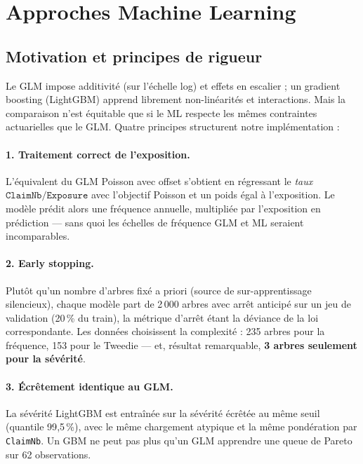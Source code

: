 \documentclass[11pt,a4paper]{article}
\begin{document}
\section{Approches Machine Learning}

\subsection{Motivation et principes de rigueur}

Le GLM impose additivité (sur l'échelle log) et effets en escalier ; un gradient boosting (LightGBM) apprend librement non-linéarités et interactions. Mais la comparaison n'est équitable que si le ML respecte les mêmes contraintes actuarielles que le GLM. Quatre principes structurent notre implémentation :

\paragraph{1. Traitement correct de l'exposition.} L'équivalent du GLM Poisson avec offset s'obtient en régressant le \emph{taux} $\texttt{ClaimNb}/\texttt{Exposure}$ avec l'objectif Poisson et un poids égal à l'exposition. Le modèle prédit alors une fréquence annuelle, multipliée par l'exposition en prédiction --- sans quoi les échelles de fréquence GLM et ML seraient incomparables.

\paragraph{2. Early stopping.} Plutôt qu'un nombre d'arbres fixé a priori (source de sur-apprentissage silencieux), chaque modèle part de 2\,000 arbres avec arrêt anticipé sur un jeu de validation (20\,\% du train), la métrique d'arrêt étant la déviance de la loi correspondante. Les données choisissent la complexité : 235 arbres pour la fréquence, 153 pour le Tweedie --- et, résultat remarquable, \textbf{3 arbres seulement pour la sévérité}.

\paragraph{3. Écrêtement identique au GLM.} La sévérité LightGBM est entraînée sur la sévérité écrêtée au même seuil (quantile 99{,}5\,\%), avec le même chargement atypique et la même pondération par \texttt{ClaimNb}. Un GBM ne peut pas plus qu'un GLM apprendre une queue de Pareto sur 62 observations.
\end{document}
